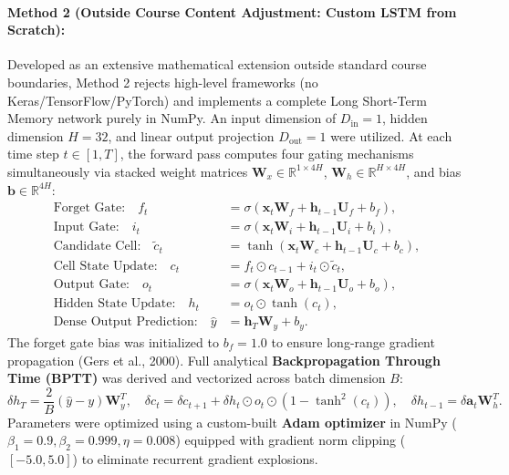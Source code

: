 \documentclass[11pt,letterpaper]{article}
\begin{document}
\paragraph{Method 2 (Outside Course Content Adjustment: Custom LSTM from Scratch):}
Developed as an extensive mathematical extension outside standard course boundaries, Method 2 rejects high-level frameworks (no Keras/TensorFlow/PyTorch) and implements a complete Long Short-Term Memory network purely in NumPy. An input dimension of $D_{\text{in}} = 1$, hidden dimension $H = 32$, and linear output projection $D_{\text{out}} = 1$ were utilized. At each time step $t \in [1, T]$, the forward pass computes four gating mechanisms simultaneously via stacked weight matrices $\mathbf{W}_x \in \mathbb{R}^{1 \times 4H}$, $\mathbf{W}_h \in \mathbb{R}^{H \times 4H}$, and bias $\mathbf{b} \in \mathbb{R}^{4H}$:
\begin{align}
    \text{Forget Gate:} \quad f_t &= \sigma(\mathbf{x}_t \mathbf{W}_f + \mathbf{h}_{t-1} \mathbf{U}_f + b_f), \\
    \text{Input Gate:} \quad i_t &= \sigma(\mathbf{x}_t \mathbf{W}_i + \mathbf{h}_{t-1} \mathbf{U}_i + b_i), \\
    \text{Candidate Cell:} \quad \tilde{c}_t &= \tanh(\mathbf{x}_t \mathbf{W}_c + \mathbf{h}_{t-1} \mathbf{U}_c + b_c), \\
    \text{Cell State Update:} \quad c_t &= f_t \odot c_{t-1} + i_t \odot \tilde{c}_t, \\
    \text{Output Gate:} \quad o_t &= \sigma(\mathbf{x}_t \mathbf{W}_o + \mathbf{h}_{t-1} \mathbf{U}_o + b_o), \\
    \text{Hidden State Update:} \quad h_t &= o_t \odot \tanh(c_t), \\
    \text{Dense Output Prediction:} \quad \hat{y} &= \mathbf{h}_T \mathbf{W}_y + b_y.
\end{align}
The forget gate bias was initialized to $b_f = 1.0$ to ensure long-range gradient propagation (Gers et al., 2000). Full analytical \textbf{Backpropagation Through Time (BPTT)} was derived and vectorized across batch dimension $B$:
\begin{equation}
    \delta h_T = \frac{2}{B}(\hat{y} - y)\mathbf{W}_y^T, \quad \delta c_t = \delta c_{t+1} + \delta h_t \odot o_t \odot (1 - \tanh^2(c_t)), \quad \delta h_{t-1} = \delta \mathbf{a}_t \mathbf{W}_h^T.
\end{equation}
Parameters were optimized using a custom-built \textbf{Adam optimizer} in NumPy ($\beta_1 = 0.9, \beta_2 = 0.999, \eta = 0.008$) equipped with gradient norm clipping ($[-5.0, 5.0]$) to eliminate recurrent gradient explosions.
\end{document}
